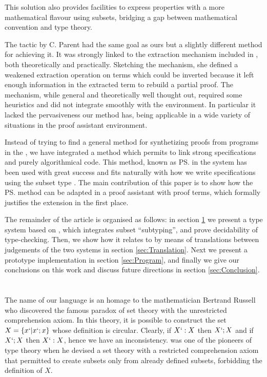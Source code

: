 \documentclass{llncs}
\begin{document}
This solution also provides %
facilities to express properties with a more mathematical flavour using subsets,
bridging a gap between mathematical convention and type theory. 

The \Program{} tactic by C. Parent \cite{conf/mpc/Parent95} had the same
goal as ours but a slightly different method for achieving it. It was strongly
linked to the extraction mechanism included in \Coq, both theoretically
and practically. Sketching the mechanism, she defined a weakened
extraction operation on \CIC{} terms which could be inverted because it left enough
information in the extracted term to rebuild a partial proof. The
mechanism, while general and theoretically well thought out, required
some heuristics and did not integrate smoothly with the \Coq{}
environment. In particular it lacked the pervasiveness our method has,
being applicable in a wide variety of situations in the proof assistant
environment.

Instead of trying to find a general method for synthetizing proofs from
programs in the \CICfull, we have integrated a method which permits to
link strong specifications and purely algorithmical code. This method,
known as \ps{} in the \PVS{} system has been used with great success and
fits naturally with how we write specifications using the subset type \cite{progmartinlof}.
The main contribution of this paper is to show how the \ps{} method 
can be adapted in a proof assistant with proof terms, which formally 
justifies the extension in the first place.

The remainder of the article is organised as follows: in section \ref{sec:Russell} we present a
type system based on \CIC, which integrates subset ``subtyping'', and
prove decidability of type-checking. Then, we show how it relates to
\CIC{} by means of translations between
judgements of the two systems in section \ref{sec:Translation}. Next we present a prototype
implementation in section \ref{sec:Program}, and finally we give our
conclusions on this work and discuss future directions in section \ref{sec:Conclusion}.

\section{\Russell{}}
\label{sec:Russell}
The name of our language is an homage to the mathematician Bertrand Russell who
discovered the famous paradox of set theory with the unrestricted
comprehension axiom. In this theory, it is possible to construct the set
$X = \{x `| x `; x\}$ whose definition is circular. Clearly, if $X `: X$
then $X `; X$ and if $X `; X$ then $X `: X$, hence we have an
inconsistency. \Russell{} was one of the pioneers of type theory when he
devised a set theory with a restricted comprehension axiom that
permitted to create subsets only from already defined subsets,
forbidding the definition of $X$. %
\end{document}
